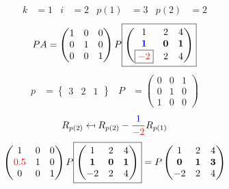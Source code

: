 \documentclass[pdf]{beamer}
\begin{document}
\begin{frame}{}\begin{align*} k &= 1 & i &= 2 & p(1) &= 3 & p(2) &= 2\end{align*} $$PA=\begin{pmatrix}1&0&0\\0&1&0\\0&0&1\end{pmatrix} P \boxed{\begin{pmatrix}1&2&4\\\mathbf{{\color{blue}1}}&\mathbf{0}&\mathbf{1}\\\boxed{{\color{red}-2}}&2&4\end{pmatrix}} $$ \begin{align*} p&= \begin{Bmatrix}3&2&1\end{Bmatrix} & P&= \begin{pmatrix}0&0&1\\0&1&0\\1&0&0\end{pmatrix} \end{align*} $$R_{p(2)} \mapsfrom R_{p(2)} - \frac{{\color{blue}1}}{{\color{red}-2}} R_{p(1)}$$ $$ \begin{pmatrix}1&0&0\\{\color{red}0.5}&1&0\\0&0&1\end{pmatrix} P \boxed{\begin{pmatrix}1&2&4\\\mathbf{1}&\mathbf{0}&\mathbf{1}\\-2&2&4\end{pmatrix}} = P \begin{pmatrix}1&2&4\\\mathbf{0}&\mathbf{1}&\mathbf{3}\\-2&2&4\end{pmatrix} $$\end{frame}
\end{document}
